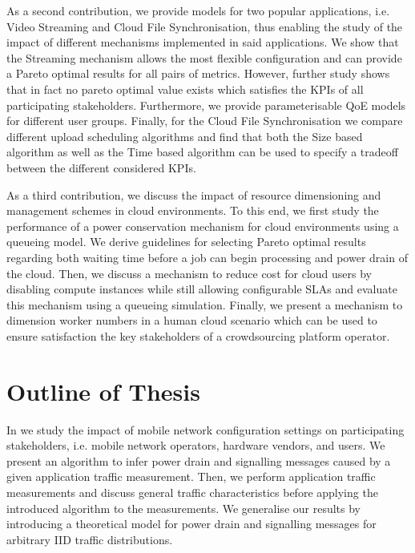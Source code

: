 As a second contribution, we provide models for two popular applications, i.e. Video Streaming and Cloud File Synchronisation, thus enabling the study of the impact of different mechanisms implemented in said applications.
We show that the Streaming mechanism allows the most flexible configuration and can provide a Pareto optimal results for all pairs of metrics.
However, further study shows that in fact no pareto optimal value exists which satisfies the \glspl{KPI} of all participating stakeholders.
Furthermore, we provide parameterisable \gls{QoE} models for different user groups.
Finally, for the Cloud File Synchronisation we compare different upload scheduling algorithms and find that both the Size based algorithm as well as the Time based algorithm can be used to specify a tradeoff between the different considered \glspl{KPI}.

As a third contribution, we discuss the impact of resource dimensioning and management schemes in cloud environments.
To this end, we first study the performance of a power conservation mechanism for cloud environments using a queueing model.
We derive guidelines for selecting Pareto optimal results regarding both waiting time before a job can begin processing and power drain of the cloud.
Then, we discuss a mechanism to reduce cost for cloud users by disabling compute instances while still allowing configurable \glspl{SLA} and evaluate this mechanism using a queueing simulation.
Finally, we present a mechanism to dimension worker numbers in a human cloud scenario which can be used to ensure satisfaction the key stakeholders of a crowdsourcing platform operator.

\section{Outline of Thesis}\label{sec:introduction:outline}

In  we study the impact of mobile network configuration settings on participating stakeholders, i.e. mobile network operators, hardware vendors, and users.
We present an algorithm to infer power drain and signalling messages caused by a given application traffic measurement.
Then, we perform application traffic measurements and discuss general traffic characteristics before applying the introduced algorithm to the measurements.
We generalise our results by introducing a theoretical model for power drain and signalling messages for arbitrary \gls{IID} traffic distributions.

